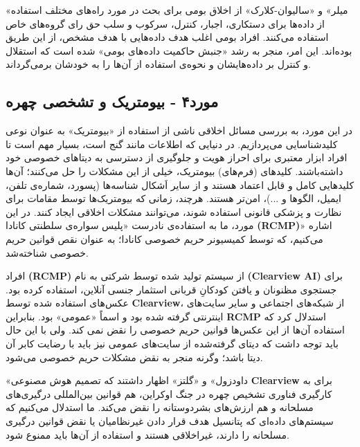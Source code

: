 «میلر» و «سالیوان-کلارک» از اخلاق بومی برای بحث در مورد راه‌های مختلف استفاده از داده‌ها برای دستکاری، اجبار، کنترل، سرکوب و سلب حق رای گروه‌های خاص استفاده می‌کنند.
افراد بومی اغلب هدف داده‌هایی با هدف مشخص، از این طریق بوده‌اند.
این امر، منجر به رشد «جنبش حاکمیت داده‌های بومی» شده است که استقلال و کنترل بر داده‌هایشان و نحوه‌ی استفاده از آن‌ها را به خودشان برمی‌گرداند.

\subsection*{مورد۴ - بیومتریک و تشخصی چهره}
در این مورد، به بررسی مسائل اخلاقی ناشی از استفاده از «بیومتریک» به عنوان نوعی کلیدشناسایی می‌پردازیم.
در دنیایی که اطلاعات مانند گنج است، بسیار مهم است تا افراد ابزار معتبری برای احراز هویت و جلوگیری از دسترسی به دیتاهای خصوصی خود داشته‌باشند.
کلید‌های (فرم‌های) بیومتریک، خیلی از این مشکلات را حل می‌کنند؛ آن‌ها کلیدهایی کامل و قابل اعتماد هستند و از سایر اَشکال شناسه‌ها (پسورد، شماره‌ی تلفن، ایمیل، الگوها و ...)، امن‌تر هستند.
هرچند، زمانی که بیومتریک‌ها توسط مقامات برای نظارت و پزشکی قانونی استفاده شوند، می‌توانند مشکلات اخلاقی ایجاد کنند.
در این مورد، ما به استفاده‌ی نادرست «پلیس سواره‌ی سلطنتی کانادا \textenglish{\textbf{(RCMP)}}» اشاره می‌کنیم، که توسط کمیسیونر حریم خصوصی کانادا؛ به عنوان نقص قوانین حریم خصوصی شناخته‌شد.

افراد \textenglish{\textbf{(RCMP)}} از سیستم تولید شده توسط شرکتی به نام \textenglish{\textbf{(Clearview AI)}} برای جستجوی مظنونان و یافتن کودکانِ قربانی استثمار جنسی آنلاین، استفاده کرده بود.
عکس‌های استفاده شده توسط \textenglish{\textbf{Clearview}}، از شبکه‌های اجتماعی و سایر سایت‌های اینترنتی گرفته شده بود و اسماً «عمومی» بود.
بنابراین \textenglish{\textbf{RCMP}} استدلال کرد که استفاده آن‌ها از این عکس‌ها قوانین حریم خصوصی را نقض نمی کند.
ولی با این حال باید توجه داشت که دیتای گرفته‌شده از سایت‌های عمومی نیز باید با رضایت کابر آن دیتا باشد؛ وگرنه منجر به نقض مشکلات حریم خصوصی می‌شود.

«داودزول» و «گلتز» اظهار داشتند که تصمیم هوش مصنوعی \textenglish{\textbf{Clearview}} برای به کارگیری فناوری تشخیص چهره در جنگ اوکراین، هم قوانین بین‌المللی درگیری‌های مسلحانه و هم ارزش‌های بشردوستانه را نقض می‌کند.
ما استدلال می‌کنیم که سیستم‌های داده‌ای که پتانسیل هدف قرار دادن غیرنظامیان یا نقض قوانین درگیری مسلحانه را دارند، غیراخلاقی هستند و استفاده از آن‌ها باید ممنوع شود.

